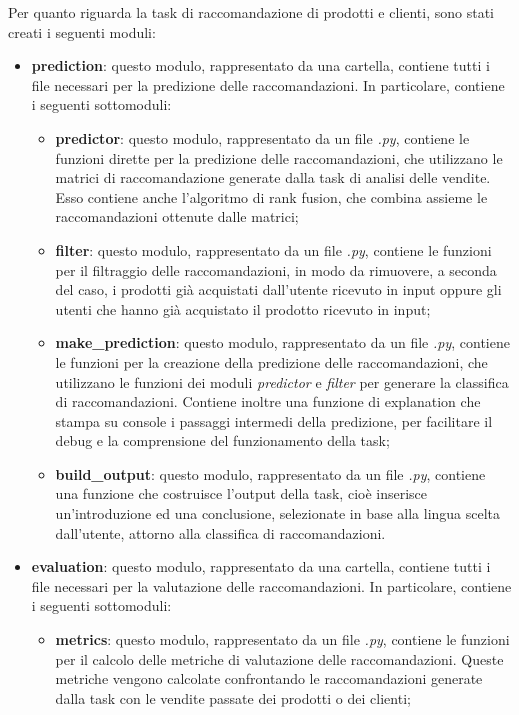 Per quanto riguarda la task di raccomandazione di prodotti e clienti, sono stati creati i seguenti moduli:
\begin{itemize}
    \item \textbf{prediction}: questo modulo, rappresentato da una cartella, contiene tutti i file necessari per la predizione delle raccomandazioni. In particolare, contiene i seguenti sottomoduli:
    \begin{itemize}
        \item \textbf{predictor}: questo modulo, rappresentato da un file \emph{.py}, contiene le funzioni dirette per la predizione delle raccomandazioni, che utilizzano le matrici di raccomandazione generate dalla task di analisi delle vendite. Esso contiene anche l'algoritmo di rank fusion, che combina assieme le raccomandazioni ottenute dalle matrici;
        \item \textbf{filter}: questo modulo, rappresentato da un file \emph{.py}, contiene le funzioni per il filtraggio delle raccomandazioni, in modo da rimuovere, a seconda del caso, i prodotti già acquistati dall'utente ricevuto in input oppure gli utenti che hanno già acquistato il prodotto ricevuto in input;
        \item \textbf{make\_prediction}: questo modulo, rappresentato da un file \emph{.py}, contiene le funzioni per la creazione della predizione delle raccomandazioni, che utilizzano le funzioni dei moduli \emph{predictor} e \emph{filter} per generare la classifica di raccomandazioni. Contiene inoltre una funzione di explanation che stampa su console i passaggi intermedi della predizione, per facilitare il debug e la comprensione del funzionamento della task;
        \item \textbf{build\_output}: questo modulo, rappresentato da un file \emph{.py}, contiene una funzione che costruisce l'output della task, cioè inserisce un'introduzione ed una conclusione, selezionate in base alla lingua scelta dall'utente, attorno alla classifica di raccomandazioni.
    \end{itemize}
    \item \textbf{evaluation}: questo modulo, rappresentato da una cartella, contiene tutti i file necessari per la valutazione delle raccomandazioni. In particolare, contiene i seguenti sottomoduli:
    \begin{itemize}
        \item \textbf{metrics}: questo modulo, rappresentato da un file \emph{.py}, contiene le funzioni per il calcolo delle metriche di valutazione delle raccomandazioni. Queste metriche vengono calcolate confrontando le raccomandazioni generate dalla task con le vendite passate dei prodotti o dei clienti;

\end{itemize}
\end{itemize}
